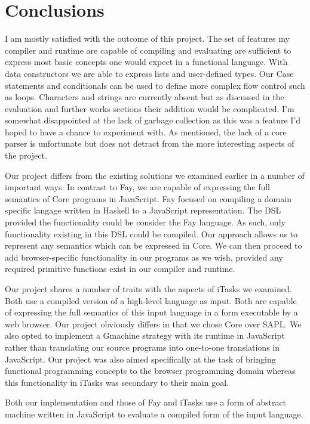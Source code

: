 \section{Conclusions}
I am mostly satisfied with the outcome of this project. The
set of features my compiler and runtime are capable of compiling
and evaluating are sufficient to express most basic concepts
one would expect in a functional language. With data constructors
we are able to express lists and user-defined types. Our Case 
statements and conditionals can be used to define more complex
flow control such as loops. Characters and strings are currently
absent but as discussed in the evaluation and further works sections
their addition would be complicated. I'm somewhat disappointed at
the lack of garbage collection as this was a feature I'd hoped to
have a chance to experiment with. As mentioned, the lack of a core
parser is unfortunate but does not detract from the more interesting
aspects of the project. 

Our project differs from the existing solutions we examined earlier
in a number of important ways. In contrast to Fay, we are capable
of expressing the full semantics of Core programs in JavaScript. 
Fay focused on compiling a domain specific langage written in Haskell
to a JavaScript representation. The DSL provided the functionality
could be consider the Fay language. As such, only functionality 
existing in this DSL could be compiled. Our approach allows us to
represent any semantics which can be expressed in Core. We
can then proceed to add browser-specific functionality in our
programs as we wish, provided any required primitive functions 
exist in our compiler and runtime. 

Our project shares a number of traits with the aspects of iTasks
we examined. Both use a compiled version of a high-level language
as input. Both are capable of expressing the full semantics of
this input language in a form executable by a web browser. Our
project obviously differs in that we chose Core over SAPL. We
also opted to implement a Gmachine strategy with its runtime
in JavaScript rather than translating our source programs into
one-to-one translations in JavaScript. Our project was also
aimed specifically at the task of bringing functional programming
concepts to the browser programming domain whereas this functionality
in iTasks was secondary to their main goal.

Both our implementation and those of Fay and iTasks use a form
of abstract machine written in JavaScript to evaluate a compiled
form of the input language. 


